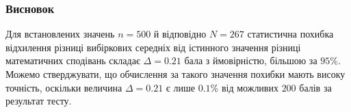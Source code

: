 \subsubsection{Висновок}

Для встановлених значень $n=500$ й відповідно $N=267$ статистична похибка відхилення різниці вибіркових 
середніх від істинного значення різниці математичних сподівань складає $\Delta = 0.21$ бала з ймовірністю, 
більшою за $95\%$. Можемо стверджувати, що обчислення за такого значення похибки мають високу точність, 
оскільки величина $\Delta = 0.21$ є лише $0.1\%$ від можливих $200$ балів за результат тесту.